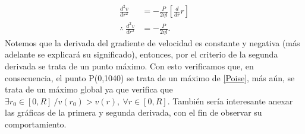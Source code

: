   \vspace{0.5cm}
\begin{align}
    \frac{d^2v}{dr^2}&=-\frac{P}{2\eta l}\left[\frac{d}{dr}r\right]\\
    \therefore \ \frac{d^2v}{dr^2}&=-\frac{P}{2\eta l}. \label{sencond_derivative_speed}
\end{align}
Notemos que la derivada del gradiente de velocidad es constante y negativa (más adelante se explicará su significado), entonces, por el criterio de la segunda derivada se trata de un punto máximo. Con esto verificamos que, en consecuencia, el punto P(0,1040) se trata de un máximo de \ref{Poise}, más aún, se trata de un máximo global ya que verifica que $\exists r_{0}\in[0,R]\ /v(r_{0})>v(r), \ \forall r \in[0,R].$ También sería interesante anexar las gráficas de la primera y segunda derivada, con el fin de observar su comportamiento.
